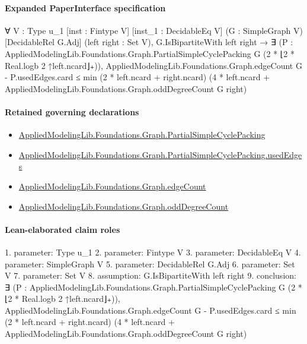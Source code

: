 \documentclass[10pt]{article}
\begin{document}
\paragraph{Expanded PaperInterface specification}
\begin{ReviewVerbatim}
∀ {V : Type u_1} [inst : Fintype V] [inst_1 : DecidableEq V] (G : SimpleGraph V) [DecidableRel G.Adj]
  (left right : Set V),
  G.IsBipartiteWith left right →
    ∃ (P : AppliedModelingLib.Foundations.Graph.PartialSimpleCyclePacking G (2 * ⌊2 * Real.logb 2 ↑left.ncard⌋₊)),
      AppliedModelingLib.Foundations.Graph.edgeCount G - P.usedEdges.card ≤
        min (2 * left.ncard + right.ncard)
          (4 * left.ncard + AppliedModelingLib.Foundations.Graph.oddDegreeCount G right)
\end{ReviewVerbatim}

\paragraph{Retained governing declarations}
\begin{itemize}\raggedright
\item \hyperlink{library-prerequisite-ce93e94db97efbc5}{Applied\allowbreak{}Modeling\allowbreak{}Lib.\allowbreak{}Foundations.\allowbreak{}Graph.\allowbreak{}Partial\allowbreak{}Simple\allowbreak{}Cycle\allowbreak{}Packing}
\item \hyperlink{library-prerequisite-85c21fec4413af63}{Applied\allowbreak{}Modeling\allowbreak{}Lib.\allowbreak{}Foundations.\allowbreak{}Graph.\allowbreak{}Partial\allowbreak{}Simple\allowbreak{}Cycle\allowbreak{}Packing.\allowbreak{}used\allowbreak{}Edges}
\item \hyperlink{library-prerequisite-6a79a1f70f063e0d}{Applied\allowbreak{}Modeling\allowbreak{}Lib.\allowbreak{}Foundations.\allowbreak{}Graph.\allowbreak{}edge\allowbreak{}Count}
\item \hyperlink{library-prerequisite-71d63b415ae0befc}{Applied\allowbreak{}Modeling\allowbreak{}Lib.\allowbreak{}Foundations.\allowbreak{}Graph.\allowbreak{}odd\allowbreak{}Degree\allowbreak{}Count}
\end{itemize}
\paragraph{Lean-elaborated claim roles}\begin{ReviewVerbatim}
1. parameter: Type u_1
2. parameter: Fintype V
3. parameter: DecidableEq V
4. parameter: SimpleGraph V
5. parameter: DecidableRel G.Adj
6. parameter: Set V
7. parameter: Set V
8. assumption: G.IsBipartiteWith left right
9. conclusion: ∃ (P : AppliedModelingLib.Foundations.Graph.PartialSimpleCyclePacking G (2 * ⌊2 * Real.logb 2 ↑left.ncard⌋₊)),
  AppliedModelingLib.Foundations.Graph.edgeCount G - P.usedEdges.card ≤
    min (2 * left.ncard + right.ncard) (4 * left.ncard + AppliedModelingLib.Foundations.Graph.oddDegreeCount G right)
\end{ReviewVerbatim}
\end{document}

